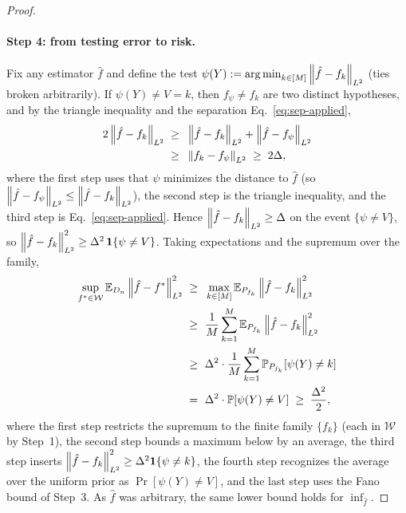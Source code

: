 \begin{proof}
\paragraph{Step 4: from testing error to risk.}
Fix any estimator $\hat f$ and define the test
$\psi(Y):=\operatorname*{arg\,min}_{k\in[M]}\left\| \hat f-f_k \right\|_{L^{2}}$ (ties broken
arbitrarily). If $\psi(Y)\ne V=k$, then $f_{\psi}\ne f_k$ are two distinct
hypotheses, and by the triangle inequality and the separation
Eq.~\eqref{eq:sep-applied},
\begin{align*}
2\left\| \hat f-f_k \right\|_{L^{2}}
\;\ge\; & ~ \left\| \hat f-f_k \right\|_{L^{2}}+\left\| \hat f-f_{\psi} \right\|_{L^{2}} \\
\;\ge\; & ~ \left\| f_k-f_{\psi} \right\|_{L^{2}}
\;\ge\; 2\Delta,
\end{align*}
where the first step uses that $\psi$ minimizes the distance to $\hat f$ (so
$\left\| \hat f-f_\psi \right\|_{L^{2}}\le\left\| \hat f-f_k \right\|_{L^{2}}$), the second step is
the triangle inequality, and the third step is Eq.~\eqref{eq:sep-applied}. Hence
$\left\| \hat f-f_k \right\|_{L^{2}}\ge\Delta$ on the event $\{\psi\ne V\}$, so
$\left\| \hat f-f_k \right\|_{L^{2}}^2\ge\Delta^2\,\mathbf{1}\{\psi\ne V\}$. Taking expectations
and the supremum over the family,
\begin{align*}
\sup_{f^*\in\mathcal{W}}\mathbb{E}_{D_n}\left\| \hat f-f^* \right\|_{L^{2}}^2
\;\ge\; & ~ \max_{k\in[M]}\mathbb{E}_{P_{f_k}}\left\| \hat f-f_k \right\|_{L^{2}}^2 \\
\;\ge\; & ~ \frac{1}{M}\sum_{k=1}^{M}\mathbb{E}_{P_{f_k}}\left\| \hat f-f_k \right\|_{L^{2}}^2 \\
\;\ge\; & ~ \Delta^2\cdot\frac{1}{M}\sum_{k=1}^{M}\mathbb{P}_{P_{f_k}}\!\left[\psi(Y)\ne k\right] \\
\;=\; & ~ \Delta^2\cdot\mathbb{P}\!\left[\psi(Y)\ne V\right]
\;\ge\; \frac{\Delta^2}{2},
\end{align*}
where the first step restricts the supremum to the finite family $\{f_k\}$
(each in $\mathcal{W}$ by Step~1), the second step bounds a maximum below by an
average, the third step inserts $\left\| \hat f-f_k \right\|_{L^{2}}^2\ge\Delta^2\mathbf{1}\{\psi\ne k\}$,
the fourth step recognizes the average over the uniform prior as
$\Pr[\psi(Y)\ne V]$, and the last step uses the Fano bound of Step~3. As
$\hat f$ was arbitrary, the same lower bound holds for $\inf_{\hat f}$.


\end{proof}
